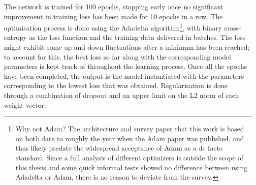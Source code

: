 The network is trained for 100 epochs, stopping early once no significant
improvement in training loss has been made for 10 epochs in a row. The
optimisation process is done using the Adadelta\citep{adadelta}
algorithm\footnote{Why not Adam\citep{adam}? The architecture\citep{kim2014conv}
and survey paper\citep{zhang2015conv} that this work is based on both date to
roughly the year when the Adam paper was published, and thus likely predate the
widespread acceptance of Adam as a de facto standard. Since a full analysis of
different optimizers is outside the scope of this thesis and some quick informal
tests showed no difference between using Adadelta or Adam, there is no reason to
deviate from the survey.}, with
binary cross-entropy as the loss function and the training data delivered in
batches.  The loss might exhibit some up and down fluctuations after a minimum
has been reached; to account for this, the best loss so far along with the
corresponding model parameters is kept track of throughout the learning process.
Once all the epochs have been completed, the output is the model instantiated
with the parameters corresponding to the lowest loss that was obtained.
Regularisation is done through a combination of dropout\citep{dropout} and an
upper limit on the L2 norm of each weight vector\citep{l2norm}.

